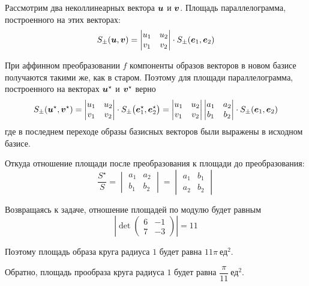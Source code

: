 \documentclass[a4paper,12pt]{article}
\begin{document}
  \begin{solution}
    Рассмотрим два неколлинеарных вектора $\boldsymbol u$ и $\boldsymbol v$.
    Площадь параллелограмма, построенного на этих векторах:
    \[
      S_{\pm}(\boldsymbol u, \boldsymbol v) = \begin{vmatrix}u_1 & u_2\\ v_1 & v_2\end{vmatrix} \cdot S_{\pm}(\boldsymbol e_1, \boldsymbol e_2)
    \]
    
    При аффинном преобразовании $f$ компоненты образов векторов в новом базисе получаются такими же, как в старом.
    Поэтому для площади параллелограмма, построенного на векторах $\boldsymbol u^\star$ и $\boldsymbol v^\star$ верно
    \[
      S_{\pm}(\boldsymbol u^\star, \boldsymbol v^\star) = \begin{vmatrix}u_1 & u_2\\ v_1 & v_2\end{vmatrix} \cdot S_{\pm}\bigl(\boldsymbol e_1^\star, \boldsymbol e_2^\star\bigr)
      = \begin{vmatrix}u_1 & u_2\\ v_1 & v_2\end{vmatrix} \begin{vmatrix}a_1 & a_2\\ b_1 & b_2\end{vmatrix} \cdot S_{\pm}(\boldsymbol e_1, \boldsymbol e_2)
    \]
    где в последнем переходе образы базисных векторов были выражены в исходном базисе.

    Откуда отношение площади после преобразования к площади до преобразования:
    \[
      \frac{S^\star}{S} = \begin{vmatrix}a_1 & a_2\\ b_1 & b_2\end{vmatrix} = \begin{vmatrix}a_1 & b_1\\ a_2 & b_2\end{vmatrix}
    \]
    
    Возвращаясь к задаче, отношение площадей по модулю будет равным
    \[
      \left|\det\begin{pmatrix}
        6 & -1\\
        7 & -3
      \end{pmatrix}\right| = 11
    \]
    
    Поэтому площадь образа круга радиуса $1$ будет равна $11 \pi\ \mbox{ед}^2$.
    
    Обратно, площадь прообраза круга радиуса $1$ будет равна $\dfrac{\pi}{11}\ \mbox{ед}^2$.
    

\end{solution}
\end{document}
